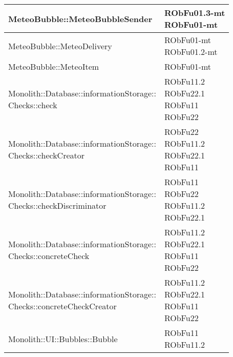 \begin{center}
\begin{longtable}{|
*{1}{>{\centering\arraybackslash}m{7.5cm}|}
*{1}{>{\centering\arraybackslash}m{2.5cm}|}}
MeteoBubble::MeteoBubbleSender & \makecell{RObFu01.3-mt
\\RObFu01-mt
\\}\\\hline
MeteoBubble::MeteoDelivery & \makecell{RObFu01-mt
\\RObFu01.2-mt
\\}\\\hline
MeteoBubble::MeteoItem & \makecell{RObFu01-mt
\\}\\\hline
\makecell[l]{Monolith::Database::informationStorage:: \\ \hfill Checks::check} & \makecell{RObFu11.2
\\RObFu22.1
\\RObFu11
\\RObFu22
\\}\\\hline
\makecell[l]{Monolith::Database::informationStorage:: \\ \hfill Checks::checkCreator} & \makecell{RObFu22
\\RObFu11.2
\\RObFu22.1
\\RObFu11
\\}\\\hline
\makecell[l]{Monolith::Database::informationStorage:: \\ \hfill Checks::checkDiscriminator} & \makecell{RObFu11
\\RObFu22
\\RObFu11.2
\\RObFu22.1
\\}\\\hline
\makecell[l]{Monolith::Database::informationStorage:: \\ \hfill Checks::concreteCheck} & \makecell{RObFu11.2
\\RObFu22.1
\\RObFu11
\\RObFu22
\\}\\\hline
\makecell[l]{Monolith::Database::informationStorage:: \\ \hfill Checks::concreteCheckCreator} & \makecell{RObFu11.2
\\RObFu22.1
\\RObFu11
\\RObFu22
\\}\\\hline
Monolith::UI::Bubbles::Bubble & \makecell{RObFu11
\\RObFu11.2
}
\end{longtable}
\end{center}
